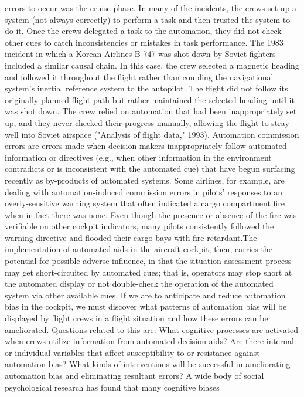 \documentclass[utf8,bachelor,manualbib]{gradu3}
\begin{document}
errors to occur was the cruise phase. In many of the incidents, the crews set up a
system (not always correctly) to perform a task and then trusted the system to do
it. Once the crews delegated a task to the automation, they did not check other cues
to catch inconsistencies or mistakes in task performance. The 1983 incident in
which a Korean Airlines B-747 was shot down by Soviet fighters included a similar
causal chain. In this case, the crew selected a magnetic heading and followed it
throughout the flight rather than coupling the navigational system's inertial reference
system to the autopilot. The flight did not follow its originally planned flight
path but rather maintained the selected heading until it was shot down. The crew
relied on automation that had been inappropriately set up, and they never checked
their progress manually, allowing the flight to stray well into Soviet airspace
("Analysis of flight data," 1993).
Automation commission errors are errors made when decision makers inappropriately
follow automated information or directives (e.g., when other information
in the environment contradicts or is inconsistent with the automated cue) that have
begun surfacing recently as by-products of automated systems. Some airlines, for
example, are dealing with automation-induced commission errors in pilots' responses
to an overly-sensitive warning system that often indicated a cargo compartment
fire when in fact there was none. Even though the presence or absence of
the fire was verifiable on other cockpit indicators, many pilots consistently followed
the warning directive and flooded their cargo bays with fire retardant.The implementation of automated aids in the aircraft cockpit, then, carries the
potential for possible adverse influence, in that the situation assessment process
may get short-circuited by automated cues; that is, operators may stop short at the
automated display or not double-check the operation of the automated system via
other available cues. If we are to anticipate and reduce automation bias in the
cockpit, we must discover what patterns of automation bias will be displayed by
flight crews in a flight situation and how these errors can be ameliorated. Questions
related to this are: What cognitive processes are activated when crews utilize
information from automated decision aids? Are there internal or individual variables
that affect susceptibility to or resistance against automation bias? What kinds
of interventions will be successful in ameliorating automation bias and eliminating
resultant errors?
A wide body of social psychological research has found that many cognitive biases
\end{document}
